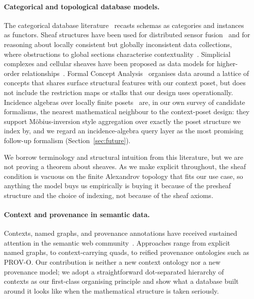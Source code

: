 \paragraph{Categorical and topological database models.}
The categorical database literature~\cite{spivak2012functorial} recasts
schemas as categories and instances as functors. Sheaf structures have
been used for distributed sensor fusion~\cite{robinson2017sheaves} and
for reasoning about locally consistent but globally inconsistent data
collections, where obstructions to global sections characterise
contextuality~\cite{abramsky2011sheaf}. Simplicial
complexes and cellular sheaves have been proposed as data models for
higher-order relationships~\cite{edelsbrunner2010computational}. Formal Concept
Analysis~\cite{ganter1999formal} organises data around a lattice of concepts
that shares surface structural features with our context poset, but does not
include the restriction maps or stalks that our design uses operationally.
Incidence algebras over locally finite posets~\cite{rota1964moebius} are,
in our own survey of candidate formalisms, the nearest mathematical
neighbour to the context-poset design: they support M{\"o}bius-inversion
style aggregation over exactly the poset structure we index by, and we
regard an incidence-algebra query layer as the most promising follow-up
formalism (Section~\ref{sec:future}).

We borrow terminology and structural intuition from this literature, but
we are not proving a theorem about sheaves. As we make explicit throughout, the
sheaf condition is vacuous on the finite Alexandrov topology that fits our
use case, so anything the model buys us empirically is buying it because of
the presheaf structure and the choice of indexing, not because of the sheaf
axioms.

\paragraph{Context and provenance in semantic data.}
Contexts, named graphs, and provenance annotations have received sustained
attention in the semantic web community~\cite{carroll2005named}. Approaches
range from explicit named graphs, to context-carrying quads, to reified
provenance ontologies such as PROV-O. Our contribution is neither a new
context ontology nor a new provenance model; we adopt a straightforward
dot-separated hierarchy of contexts as our first-class organising principle and
show what a database built around it looks like when the mathematical structure
is taken seriously.

